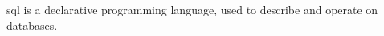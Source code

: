 \acrshort{sql} is a \gls{declarative} programming language, used to describe and operate on databases.
